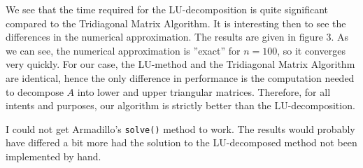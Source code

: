 \documentclass[10pt,a4paper]{amsart}
\begin{document}
We see that the time required for the LU-decomposition is quite significant compared to the Tridiagonal Matrix Algorithm. It is interesting then to see the differences in the numerical approximation. The results are given in figure 3. As we can see, the numerical approximation is ''exact'' for $n = 100$, so it converges very quickly. For our case, the LU-method and the Tridiagonal Matrix Algorithm are identical, hence the only difference in performance is the computation needed to decompose $A$ into lower and upper triangular matrices. Therefore, for all intents and purposes, our algorithm is strictly better than the LU-decomposition.

I could not get Armadillo's \texttt{solve()} method to work. The results would probably have differed a bit more had the solution to the LU-decomposed method not been implemented by hand.
\end{document}
